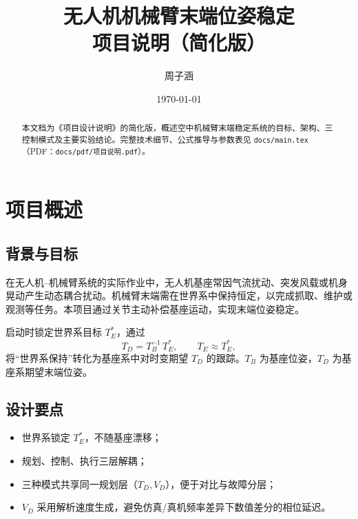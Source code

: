 \documentclass[UTF8, a4paper, 12pt]{ctexart}
\title{\textbf{无人机机械臂末端位姿稳定\\项目说明（简化版）}}
\author{周子涵}
\date{\today}
\begin{document}
\maketitle

\begin{abstract}
本文档为《项目设计说明》的简化版，概述空中机械臂末端稳定系统的目标、架构、三控制模式及主要实验结论。完整技术细节、公式推导与参数表见 \texttt{docs/main.tex}（PDF：\texttt{docs/pdf/项目说明.pdf}）。
\end{abstract}

\clearpage
\tableofcontents
\clearpage

\section{项目概述}

\subsection{背景与目标}

在无人机--机械臂系统的实际作业中，无人机基座常因气流扰动、突发风载或机身晃动产生动态耦合扰动。机械臂末端需在世界系中保持恒定，以完成抓取、维护或观测等任务。本项目通过关节主动补偿基座运动，实现末端位姿稳定。

启动时锁定世界系目标 $T_E^*$，通过
\begin{equation}
    T_D = T_B^{-1}\, T_E^*, \qquad T_E \approx T_E^*,
\end{equation}
将``世界系保持''转化为基座系中对时变期望 $T_D$ 的跟踪。$T_B$ 为基座位姿，$T_D$ 为基座系期望末端位姿。

\subsection{设计要点}

\begin{itemize}[leftmargin=2em]
    \item 世界系锁定 $T_E^*$，不随基座漂移；
    \item 规划、控制、执行三层解耦；
    \item 三种模式共享同一规划层（$T_D,V_D$），便于对比与故障分层；
    \item $V_D$ 采用解析速度生成，避免仿真/真机频率差异下数值差分的相位延迟。
\end{itemize}
\end{document}
